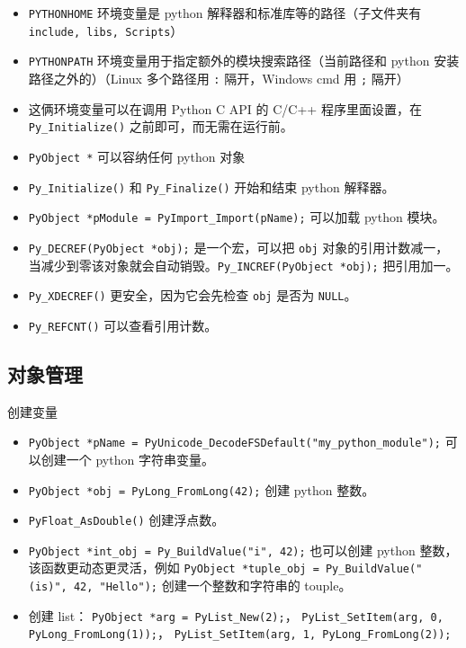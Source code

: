 

\begin{itemize}
\item \verb`PYTHONHOME` 环境变量是 python 解释器和标准库等的路径（子文件夹有 \verb`include, libs, Scripts`）
\item \verb`PYTHONPATH` 环境变量用于指定额外的模块搜索路径（当前路径和 python 安装路径之外的）（Linux 多个路径用 \verb`:` 隔开，Windows cmd 用 \verb`;` 隔开）
\item 这俩环境变量可以在调用 Python C API 的 C/C++ 程序里面设置，在 \verb`Py_Initialize()` 之前即可，而无需在运行前。
\item \verb`PyObject *` 可以容纳任何 python 对象
\item \verb`Py_Initialize()` 和 \verb`Py_Finalize()` 开始和结束 python 解释器。
\item \verb`PyObject *pModule = PyImport_Import(pName);` 可以加载 python 模块。
\item \verb`Py_DECREF(PyObject *obj);` 是一个宏，可以把 \verb`obj` 对象的引用计数减一， 当减少到零该对象就会自动销毁。\verb`Py_INCREF(PyObject *obj);` 把引用加一。
\item \verb`Py_XDECREF()` 更安全，因为它会先检查 \verb`obj` 是否为 \verb`NULL`。
\item \verb`Py_REFCNT()` 可以查看引用计数。
\end{itemize}

\subsection{对象管理}
创建变量
\begin{itemize}
\item \verb`PyObject *pName = PyUnicode_DecodeFSDefault("my_python_module");` 可以创建一个 python 字符串变量。
\item \verb`PyObject *obj = PyLong_FromLong(42);` 创建 python 整数。
\item \verb`PyFloat_AsDouble()` 创建浮点数。
\item \verb`PyObject *int_obj = Py_BuildValue("i", 42);` 也可以创建 python 整数，该函数更动态更灵活，例如 \verb`PyObject *tuple_obj = Py_BuildValue("(is)", 42, "Hello");` 创建一个整数和字符串的 touple。
\item 创建 list： \verb`PyObject *arg = PyList_New(2);`， \verb`PyList_SetItem(arg, 0, PyLong_FromLong(1));`， \verb`PyList_SetItem(arg, 1, PyLong_FromLong(2));`
\end{itemize}

